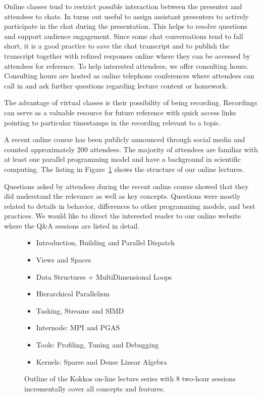 Online classes tend to restrict possible interaction between the presenter and attendees to chats. In turns out useful to assign assistant presenters to actively participate in the chat during the presentation. This helps to resolve questions and support audience engagement. Since some chat conversations tend to fall short, it is a good practice to save the chat transcript and to publish the transcript together with refined responses online where they can be accessed by attendees for reference. To help interested attendees, we offer consulting hours. Consulting hours are hosted as online telephone conferences where attendees can call in and ask further questions regarding lecture content or homework.

The advantage of virtual classes is their possibility of being recording. Recordings can serve as a valuable resource for future reference with quick access links pointing to particular timestamps in the recording relevant to a topic. 

A recent online course\cite{KOKKOS_LECTURE} has been publicly announced through social media and counted approximately 200 attendees. The majority of attendees are familiar with at least one parallel programming model and have a background in scientific computing. The listing in Figure~\ref{fig:lectureOutline} shows the structure of our online lectures.

Questions asked by attendees during the recent online course showed that they did understand the relevance as well as key concepts. Questions were mostly related to details in behavior, differences to other programming models, and best practices. We would like to direct the interested reader to our online website where the Q\&A sessions are listed in detail.

\begin{figure}

\begin{itemize}
\item Introduction, Building and Parallel Dispatch
\item Views and Spaces
\item Data Structures + MultiDimensional Loops
\item Hierarchical Parallelism
\item Tasking, Streams and SIMD
\item Internode: MPI and PGAS
\item Tools: Profiling, Tuning and Debugging
\item Kernels: Sparse and Dense Linear Algebra
\end{itemize}
\caption{Outline of the Kokkos on-line lecture series with 8 two-hour sessions incrementally cover all concepts and features.}
\label{fig:lectureOutline}
\end{figure}




